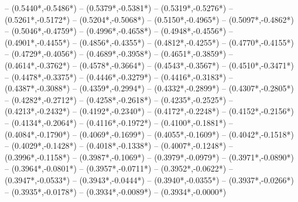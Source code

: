 {	-- ({0.5440*\dx},{-0.5486*\dy})
	-- ({0.5379*\dx},{-0.5381*\dy})
	-- ({0.5319*\dx},{-0.5276*\dy})
	-- ({0.5261*\dx},{-0.5172*\dy})
	-- ({0.5204*\dx},{-0.5068*\dy})
	-- ({0.5150*\dx},{-0.4965*\dy})
	-- ({0.5097*\dx},{-0.4862*\dy})
	-- ({0.5046*\dx},{-0.4759*\dy})
	-- ({0.4996*\dx},{-0.4658*\dy})
	-- ({0.4948*\dx},{-0.4556*\dy})
	-- ({0.4901*\dx},{-0.4455*\dy})
	-- ({0.4856*\dx},{-0.4355*\dy})
	-- ({0.4812*\dx},{-0.4255*\dy})
	-- ({0.4770*\dx},{-0.4155*\dy})
	-- ({0.4729*\dx},{-0.4056*\dy})
	-- ({0.4689*\dx},{-0.3958*\dy})
	-- ({0.4651*\dx},{-0.3859*\dy})
	-- ({0.4614*\dx},{-0.3762*\dy})
	-- ({0.4578*\dx},{-0.3664*\dy})
	-- ({0.4543*\dx},{-0.3567*\dy})
	-- ({0.4510*\dx},{-0.3471*\dy})
	-- ({0.4478*\dx},{-0.3375*\dy})
	-- ({0.4446*\dx},{-0.3279*\dy})
	-- ({0.4416*\dx},{-0.3183*\dy})
	-- ({0.4387*\dx},{-0.3088*\dy})
	-- ({0.4359*\dx},{-0.2994*\dy})
	-- ({0.4332*\dx},{-0.2899*\dy})
	-- ({0.4307*\dx},{-0.2805*\dy})
	-- ({0.4282*\dx},{-0.2712*\dy})
	-- ({0.4258*\dx},{-0.2618*\dy})
	-- ({0.4235*\dx},{-0.2525*\dy})
	-- ({0.4213*\dx},{-0.2432*\dy})
	-- ({0.4192*\dx},{-0.2340*\dy})
	-- ({0.4172*\dx},{-0.2248*\dy})
	-- ({0.4152*\dx},{-0.2156*\dy})
	-- ({0.4134*\dx},{-0.2064*\dy})
	-- ({0.4116*\dx},{-0.1972*\dy})
	-- ({0.4100*\dx},{-0.1881*\dy})
	-- ({0.4084*\dx},{-0.1790*\dy})
	-- ({0.4069*\dx},{-0.1699*\dy})
	-- ({0.4055*\dx},{-0.1609*\dy})
	-- ({0.4042*\dx},{-0.1518*\dy})
	-- ({0.4029*\dx},{-0.1428*\dy})
	-- ({0.4018*\dx},{-0.1338*\dy})
	-- ({0.4007*\dx},{-0.1248*\dy})
	-- ({0.3996*\dx},{-0.1158*\dy})
	-- ({0.3987*\dx},{-0.1069*\dy})
	-- ({0.3979*\dx},{-0.0979*\dy})
	-- ({0.3971*\dx},{-0.0890*\dy})
	-- ({0.3964*\dx},{-0.0801*\dy})
	-- ({0.3957*\dx},{-0.0711*\dy})
	-- ({0.3952*\dx},{-0.0622*\dy})
	-- ({0.3947*\dx},{-0.0533*\dy})
	-- ({0.3943*\dx},{-0.0444*\dy})
	-- ({0.3940*\dx},{-0.0355*\dy})
	-- ({0.3937*\dx},{-0.0266*\dy})
	-- ({0.3935*\dx},{-0.0178*\dy})
	-- ({0.3934*\dx},{-0.0089*\dy})
	-- ({0.3934*\dx},{-0.0000*\dy})
}
